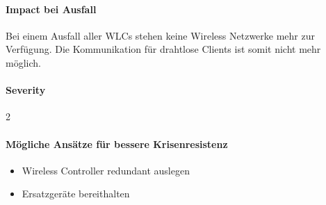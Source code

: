 \paragraph{Impact bei Ausfall}
Bei einem Ausfall aller WLCs stehen keine Wireless Netzwerke mehr zur Verfügung. Die Kommunikation für drahtlose Clients ist somit nicht mehr möglich.

\paragraph{Severity} 2

\paragraph{Mögliche Ansätze für bessere Krisenresistenz}
\begin{itemize}
	\item Wireless Controller redundant auslegen
	\item Ersatzgeräte bereithalten
\end{itemize}
